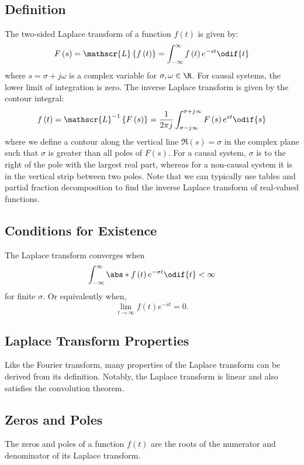 \documentclass{article}
\begin{document}
\subsection{Definition}
The two-sided Laplace transform of a function \(f\left( t \right)\) is
given by:
\begin{equation*}
    F\left( s \right) = \mathscr{L}\left\{ f\left( t \right) \right\} = \int_{-\infty}^\infty f\left( t \right) e^{-st} \odif{t}
\end{equation*}
where \(s = \sigma + j \omega\) is a complex variable for \(\sigma, \omega \in \R\).
For causal systems, the lower limit of integration is zero.
The inverse Laplace transform is given by the contour integral:
\begin{equation*}
    f\left( t \right) = \mathscr{L}^{-1}\left\{ F\left( s \right) \right\} = \frac{1}{2\pi j} \int_{\sigma - j\infty}^{\sigma + j\infty} F\left( s \right) e^{st} \odif{s}
\end{equation*}
where we define a contour along the vertical line \(\Re\left( s \right) = \sigma\)
in the complex plane such that \(\sigma\) is greater than all poles
of \(F\left( s \right)\). For a causal system, \(\sigma\) is to the
right of the pole with the largest real part, whereas for a non-causal
system it is in the vertical strip between two poles. Note that we can
typically use tables and partial fraction decomposition to find the
inverse Laplace transform of real-valued functions.
\subsection{Conditions for Existence}
The Laplace transform converges when
\begin{equation*}
    \int_{-\infty}^\infty \abs*{f\left( t \right) e^{-\sigma t}} \odif{t} < \infty
\end{equation*}
for finite \(\sigma\). Or equivalently when,
\begin{equation*}
    \lim_{t \to \infty} f\left( t \right) e^{-s t} = 0.
\end{equation*}
\subsection{Laplace Transform Properties}
Like the Fourier transform, many properties of the Laplace transform
can be derived from its definition. Notably, the Laplace transform is
linear and also satisfies the convolution theorem.
\subsection{Zeros and Poles}
The zeros and poles of a function \(f\left( t \right)\) are the roots
of the numerator and denominator of its Laplace transform.
\end{document}
